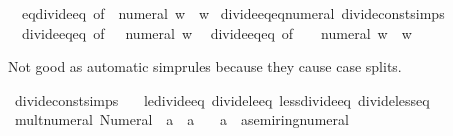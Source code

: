 \begin{isabellebody}
\ \ eq{\isacharunderscore}{\kern0pt}divide{\isacharunderscore}{\kern0pt}eq\ {\isacharbrackleft}{\kern0pt}of\ {\isachardoublequoteopen}{\isacharminus}{\kern0pt}\ numeral\ w{\isachardoublequoteclose}{\isacharbrackright}{\kern0pt}\ \ w\isanewline
\isanewline
{}\isamarkupfalse%
\ divide{\isacharunderscore}{\kern0pt}eq{\isacharunderscore}{\kern0pt}eq{\isacharunderscore}{\kern0pt}numeral\ {\isacharbrackleft}{\kern0pt}divide{\isacharunderscore}{\kern0pt}const{\isacharunderscore}{\kern0pt}simps{\isacharbrackright}{\kern0pt}\ {\isacharequal}{\kern0pt}\isanewline
\ \ divide{\isacharunderscore}{\kern0pt}eq{\isacharunderscore}{\kern0pt}eq\ {\isacharbrackleft}{\kern0pt}of\ {\isacharunderscore}{\kern0pt}\ {\isacharunderscore}{\kern0pt}\ {\isachardoublequoteopen}numeral\ w{\isachardoublequoteclose}{\isacharbrackright}{\kern0pt}\isanewline
\ \ divide{\isacharunderscore}{\kern0pt}eq{\isacharunderscore}{\kern0pt}eq\ {\isacharbrackleft}{\kern0pt}of\ {\isacharunderscore}{\kern0pt}\ {\isacharunderscore}{\kern0pt}\ {\isachardoublequoteopen}{\isacharminus}{\kern0pt}\ numeral\ w{\isachardoublequoteclose}{\isacharbrackright}{\kern0pt}\ \ w%
\begin{isamarkuptext}%
Not good as automatic simprules because they cause case splits.%
\end{isamarkuptext}\isamarkuptrue%
\isamarkupfalse%
\ {\isacharbrackleft}{\kern0pt}divide{\isacharunderscore}{\kern0pt}const{\isacharunderscore}{\kern0pt}simps{\isacharbrackright}{\kern0pt}\ {\isacharequal}{\kern0pt}\isanewline
\ \ le{\isacharunderscore}{\kern0pt}divide{\isacharunderscore}{\kern0pt}eq{\isacharunderscore}{\kern0pt}{}\ divide{\isacharunderscore}{\kern0pt}le{\isacharunderscore}{\kern0pt}eq{\isacharunderscore}{\kern0pt}{}\ less{\isacharunderscore}{\kern0pt}divide{\isacharunderscore}{\kern0pt}eq{\isacharunderscore}{\kern0pt}{}\ divide{\isacharunderscore}{\kern0pt}less{\isacharunderscore}{\kern0pt}eq{\isacharunderscore}{\kern0pt}{}%
\isadelimdocument
%
\endisadelimdocument
%
\isatagdocument
%
\isamarkuptrue%
%
\endisatagdocument
{\isafolddocument}%
%
\isadelimdocument
%
\endisadelimdocument
{}\isamarkupfalse%
\ mult{\isacharunderscore}{\kern0pt}numeral{\isacharunderscore}{\kern0pt}{}{\isacharcolon}{\kern0pt}\ {\isachardoublequoteopen}Numeral{}\ {\isacharasterisk}{\kern0pt}\ a\ {\isacharequal}{\kern0pt}\ a{\isachardoublequoteclose}\isanewline
\ \ \ a\ {\isacharcolon}{\kern0pt}{\isacharcolon}{\kern0pt}\ {\isachardoublequoteopen}{\isacharprime}{\kern0pt}a{\isacharcolon}{\kern0pt}{\isacharcolon}{\kern0pt}semiring{\isacharunderscore}{\kern0pt}numeral{\isachardoublequoteclose}\isanewline

\end{isabellebody}
